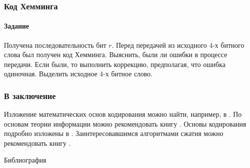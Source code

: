 \begin{frame}
    \frametitle{Код Хемминга}
    \framesubtitle{Задание}
    
    Получена последовательность бит $r$. Перед передачей из исходного 4-х битного слова был получен код Хемминга. Выяснить, были ли ошибки в процессе передачи. Если были, то выполнить коррекцию, предполагая, что ошибка одиночная. Выделить исходное 4-х битное слово.
    \begin{center}
    \end{center}
\end{frame}    


\appendix


\begin{frame}
    \frametitle{В заключение}
    
    Изложение  математических основ кодирования можно найти, например, в \cite{bib:novic:discrmathprogrammer,bib:yablonsky:discreteintro}. По основам теории информации можно рекомендовать книгу \cite{bib:panin:informationTheory}. Основы кодирования подробно изложены в \cite{bib:verner:codingBase}. Заинтересовавшимся алгоритмами сжатия можно рекомендовать книгу \cite{bib:salmon:compressing}.
\end{frame}


\begin{frame}[allowframebreaks]{Библиография}
    
    
\end{frame}

